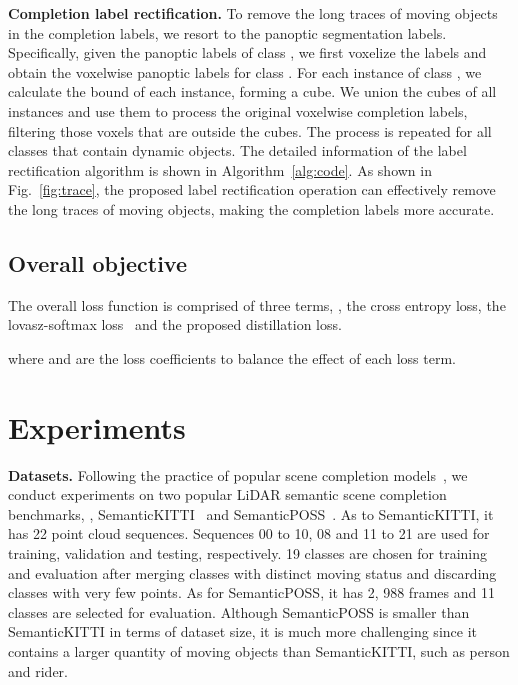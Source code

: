 \documentclass[10pt,twocolumn,letterpaper]{article}
\begin{document}
\noindent \textbf{Completion label rectification.} To remove the long traces of moving objects in the completion labels, we resort to the panoptic segmentation labels. Specifically, given the panoptic labels of class , we first voxelize the labels and obtain the voxelwise panoptic labels for class . For each instance of class , we calculate the bound of each instance, forming a cube. We union the cubes of all instances and use them to process the original voxelwise completion labels, filtering those voxels that are outside the cubes. The process is repeated for all classes that contain dynamic objects. The detailed information of the label rectification algorithm is shown in Algorithm~\ref{alg:code}. As shown in Fig.~\ref{fig:trace}, the proposed label rectification operation can effectively remove the long traces of moving objects, making the completion labels more accurate.






\subsection{Overall objective}

The overall loss function is comprised of three terms, \ie, the cross entropy loss, the lovasz-softmax loss~\cite{berman2018the} and the proposed distillation loss.



\noindent where  and  are the loss coefficients to balance the effect of each loss term.
 
\section{Experiments}
\label{sec:experiments}


\noindent \textbf{Datasets.} Following the practice of popular scene completion models~\cite{js3cnet,s3cnet}, we conduct experiments on two popular LiDAR semantic scene completion benchmarks, \ie, SemanticKITTI~\cite{behley2019semantickitti} and SemanticPOSS~\cite{semanticposs}. As to SemanticKITTI, it has 22 point cloud sequences. Sequences 00 to 10, 08 and 11 to 21 are used for training, validation and testing, respectively. 19 classes are chosen for training and evaluation after merging classes with distinct moving status and discarding classes with very few points. As for SemanticPOSS, it has 2, 988 frames and 11 classes are selected for evaluation. Although SemanticPOSS is smaller than SemanticKITTI in terms of dataset size, it is much more challenging since it contains a larger quantity of moving objects than SemanticKITTI, such as person and rider.
\end{document}
